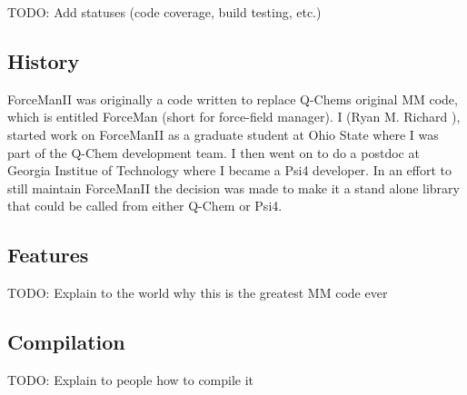 T\+O\+DO\+: Add statuses (code coverage, build testing, etc.)

\subsection*{History}

Force\+Man\+II was originally a code written to replace Q-\/\+Chem\textquotesingle{}s original MM code, which is entitled Force\+Man (short for force-\/field manager). I (Ryan M. Richard ), started work on Force\+Man\+II as a graduate student at Ohio State where I was part of the Q-\/\+Chem development team. I then went on to do a postdoc at Georgia Institue of Technology where I became a Psi4 developer. In an effort to still maintain Force\+Man\+II the decision was made to make it a stand alone library that could be called from either Q-\/\+Chem or Psi4.

\subsection*{Features}

T\+O\+DO\+: Explain to the world why this is the greatest MM code ever

\subsection*{Compilation}

T\+O\+DO\+: Explain to people how to compile it 
